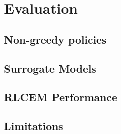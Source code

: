 \documentclass[../main.tex]{subfiles}
\begin{document}
\chapter{Evaluation}

\section{Non-greedy policies}

\section{Surrogate Models}

\section{RLCEM Performance}

\section{Limitations}
\end{document}
